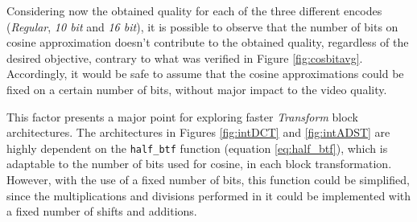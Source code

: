 Considering now the obtained quality for each of the three different encodes (\emph{Regular}, \emph{10 bit} and \emph{16 bit}), it is possible to observe that the number of bits on cosine approximation doesn't contribute to the obtained quality, regardless of the desired objective, contrary to what was verified in Figure \ref{fig:cosbitavg}. Accordingly, it would be safe to assume that the cosine approximations could be fixed on a certain number of bits, without major impact to the video quality.

This factor presents a major point for exploring faster \emph{Transform} block architectures. The architectures in Figures \ref{fig:intDCT} and \ref{fig:intADST} are highly dependent on the \texttt{half\_btf} function (equation \ref{eq:half_btf}), which is adaptable to the number of bits used for cosine, in each block transformation. However, with the use of a fixed number of bits, this function could be simplified, since the multiplications and divisions performed in it could be implemented with a fixed number of shifts and additions.

\clearpage
\printbibliography[heading=subbibliography]
